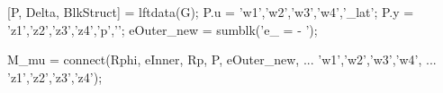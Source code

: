 [P, Delta, BlkStruct] = lftdata(G); 
P.u = {'w1','w2','w3','w4','\delta_{lat}'}; %
P.y = {'z1','z2','z3','z4','p','\phi'}; %
eOuter_new = sumblk('e_{\phi} = - \phi');

M_mu = connect(Rphi, eInner, Rp, P, eOuter_new, ...
      {'w1','w2','w3','w4'}, ...
      {'z1','z2','z3','z4'}); 